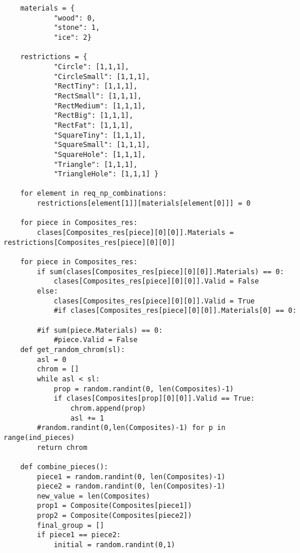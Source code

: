 \begin{verbatim}
    materials = {
            "wood": 0,
            "stone": 1,
            "ice": 2}

    restrictions = {
            "Circle": [1,1,1],
            "CircleSmall": [1,1,1],
            "RectTiny": [1,1,1],
            "RectSmall": [1,1,1],
            "RectMedium": [1,1,1],
            "RectBig": [1,1,1],
            "RectFat": [1,1,1],
            "SquareTiny": [1,1,1],
            "SquareSmall": [1,1,1],
            "SquareHole": [1,1,1],
            "Triangle": [1,1,1],
            "TriangleHole": [1,1,1] }

    for element in req_np_combinations:
        restrictions[element[1]][materials[element[0]]] = 0
        
    for piece in Composites_res:
        clases[Composites_res[piece][0][0]].Materials = restrictions[Composites_res[piece][0][0]]
        
    for piece in Composites_res:
        if sum(clases[Composites_res[piece][0][0]].Materials) == 0:
            clases[Composites_res[piece][0][0]].Valid = False
        else:
            clases[Composites_res[piece][0][0]].Valid = True
            #if clases[Composites_res[piece][0][0]].Materials[0] == 0:
                
        #if sum(piece.Materials) == 0:
            #piece.Valid = False
    def get_random_chrom(sl):
        asl = 0
        chrom = []
        while asl < sl:
            prop = random.randint(0, len(Composites)-1)
            if clases[Composites[prop][0][0]].Valid == True:
                chrom.append(prop)
                asl += 1
        #random.randint(0,len(Composites)-1) for p in range(ind_pieces)
        return chrom

    def combine_pieces():
        piece1 = random.randint(0, len(Composites)-1)
        piece2 = random.randint(0, len(Composites)-1)
        new_value = len(Composites)
        prop1 = Composite(Composites[piece1])
        prop2 = Composite(Composites[piece2])
        final_group = []
        if piece1 == piece2:
            initial = random.randint(0,1)
            

\end{verbatim}
